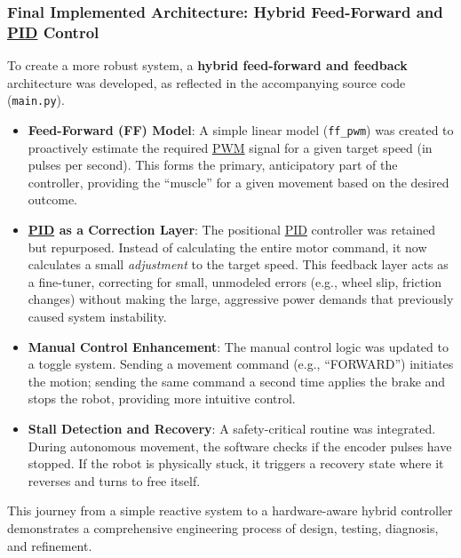 \subsubsection{Final Implemented Architecture: Hybrid Feed-Forward and \texorpdfstring{\hyperref[term:pid]{PID}}{PID} Control}
To create a more robust system, a \textbf{hybrid feed-forward and feedback} architecture was developed, as reflected in the accompanying source code (\texttt{main.py}).
\begin{itemize}
    \item \textbf{Feed-Forward (FF) Model}: A simple linear model (\texttt{ff\_pwm}) was created to proactively estimate the required \hyperref[term:pwm]{PWM} signal for a given target speed (in pulses per second). This forms the primary, anticipatory part of the controller, providing the ``muscle'' for a given movement based on the desired outcome.
    \item \textbf{\hyperref[term:pid]{PID} as a Correction Layer}: The positional \hyperref[term:pid]{PID} controller was retained but repurposed. Instead of calculating the entire motor command, it now calculates a small \textit{adjustment} to the target speed. This feedback layer acts as a fine-tuner, correcting for small, unmodeled errors (e.g., wheel slip, friction changes) without making the large, aggressive power demands that previously caused system instability.
    \item \textbf{Manual Control Enhancement}: The manual control logic was updated to a toggle system. Sending a movement command (e.g., ``FORWARD'') initiates the motion; sending the same command a second time applies the brake and stops the robot, providing more intuitive control.
    \item \textbf{Stall Detection and Recovery}: A safety-critical routine was integrated. During autonomous movement, the software checks if the encoder pulses have stopped. If the robot is physically stuck, it triggers a recovery state where it reverses and turns to free itself.
\end{itemize}
This journey from a simple reactive system to a hardware-aware hybrid controller demonstrates a comprehensive engineering process of design, testing, diagnosis, and refinement.

